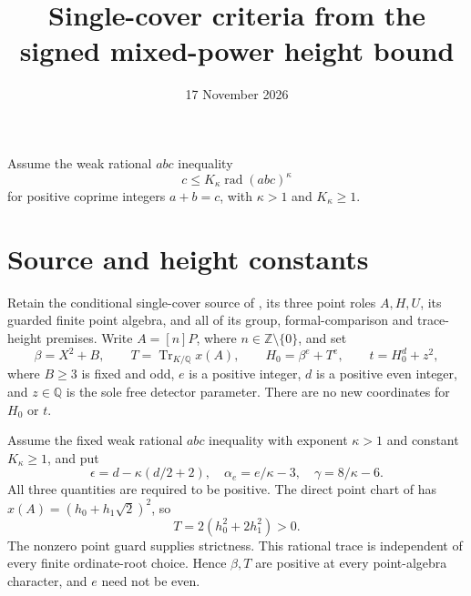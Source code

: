 \documentclass[11pt,a4paper]{article}
\title{Single-cover criteria from the signed mixed-power height bound}
\author{}\date{17 November 2026}
\DeclareMathOperator{\rad}{rad}
\newcommand{\Q}{\mathbb Q}\newcommand{\Z}{\mathbb Z}
\begin{document}
\maketitle

Assume the weak rational $abc$ inequality
\begin{equation}\label{eq:abc}
 c\le K_\kappa\rad(abc)^\kappa
\end{equation}
for positive coprime integers $a+b=c$, with $\kappa>1$ and $K_\kappa\ge1$.

\section{Source and height constants}
Retain the conditional single-cover source of \cite{Single}, its
three point roles $A,H,U$, its guarded finite point algebra, and all
of its group, formal-comparison and trace-height premises. Write
$A=[n]P$, where $n\in\Z\setminus\{0\}$, and set
\[
 \beta=X^2+B,\qquad T=\operatorname{Tr}_{K/\Q}x(A),\qquad
 H_0=\beta^e+T^e,\qquad t=H_0^d+z^2,
\]
where $B\ge3$ is fixed and odd, $e$ is a positive integer, $d$ is
a positive even integer,
and $z\in\Q$ is the sole free detector parameter.
There are no new coordinates for $H_0$ or $t$.

Assume the fixed weak rational $abc$ inequality with exponent
$\kappa>1$ and constant $K_\kappa\ge1$, and put
\[
 \epsilon=d-\kappa(d/2+2),\quad
 \alpha_e=e/\kappa-3,\quad
 \gamma=8/\kappa-6.
\]
All three quantities are required to be positive. The direct point
chart of \cite[Section 3]{Conditional} has
$x(A)=(h_0+h_1\sqrt2)^2$, so
\begin{equation}\label{eq:positiveT}
 T=2(h_0^2+2h_1^2)>0.
\end{equation}
The nonzero point guard supplies strictness. This rational trace is
independent of every finite ordinate-root choice. Hence $\beta,T$ are
positive at every point-algebra character, and $e$ need not be even.
\end{document}
